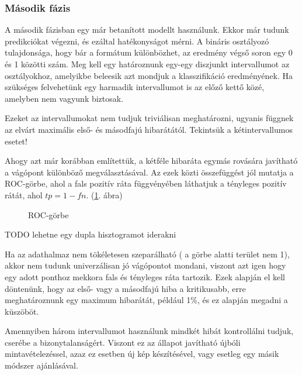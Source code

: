 \subsubsection{Második fázis}
\label{sec:masodik.fazis}

A második fázisban egy már betanított modellt használunk. Ekkor már tudunk predikciókat 
végezni, és ezáltal hatékonyságot mérni. A bináris osztályozó tulajdonsága, hogy bár
a formátum különbözhet, az eredmény végső soron egy 0 és 1 közötti szám. Meg kell egy határoznunk egy-egy diszjunkt intervallumot az osztályokhoz, amelyikbe beleesik azt mondjuk
a klasszifikáció eredményének. Ha szükséges felvehetünk egy harmadik intervallumot is 
az előző kettő közé, amelyben nem vagyunk biztosak.


Ezeket az intervallumokat nem tudjuk triviálisan meghatározni, ugyanis függnek az 
elvárt maximális első- és másodfajú hibarátától. Tekintsük a kétintervallumos esetet!

Ahogy azt már korábban említettük, a kétféle hibaráta egymás rovására javítható a 
vágópont különböző megválasztásával. Az ezek közti összefüggést jól mutatja a 
ROC-görbe, ahol a fals pozitív ráta függvényében láthatjuk a tényleges
pozitív rátát, ahol $ tp = 1 - fn $. 
(\ref{fig:roc.pelda}. ábra)


\begin{figure}[htbp]
	\centering
	
	\caption{ROC-görbe}
	\label{fig:roc.pelda}
\end{figure}


TODO lehetne egy dupla hisztogramot iderakni

Ha az adathalmaz nem tökéletesen szeparálható ( a görbe alatti terület nem 1), akkor
nem tudunk univerzálisan jó vágópontot mondani, viszont azt igen hogy egy adott ponthoz 
mekkora fals és tényleges ráta tartozik. Ezek alapján el kell döntenünk, hogy az 
első- vagy a másodfajú hiba a kritikusabb, erre meghatároznunk egy maximum hibarátát,
például 1\%, és ez alapján megadni a küszöböt.


Amennyiben három intervallumot használunk mindkét hibát kontrollálni tudjuk, cserébe a 
bizonytalanságért. Viszont ez az állapot javítható újbóli mintavételezéssel, azaz 
ez esetben új kép készítésével, vagy esetleg egy másik módszer ajánlásával.











